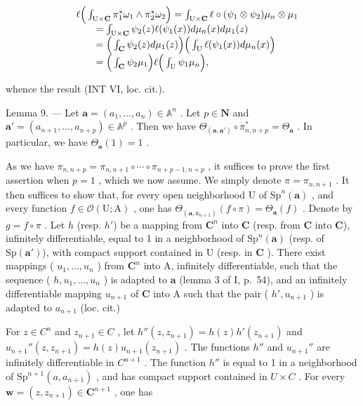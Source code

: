\[
\begin{array}{r l} & {\ell \Big (\int_ {\mathrm{U} \times \mathbf {C}} \pi_ {1} ^ {*} \omega_ {1} \wedge \pi_ {2} ^ {*} \omega_ {2} \Big) = \int_ {\mathrm{U} \times \mathbf {C}} \ell \circ (\psi_ {1} \otimes \psi_ {2}) \mu_ {n} \otimes \mu_ {1}} \\ & {\qquad = \int_ {\mathrm{U} \times \mathbf {C}} \psi_ {2} (z) \ell (\psi_ {1} (x)) d \mu_ {n} (x) d \mu_ {1} (z)} \\ & {\qquad = \Big (\int_ {\mathbf {C}} \psi_ {2} (z) d \mu_ {1} (z) \Big) \Big (\int_ {\mathrm{U}} \ell (\psi_ {1} (x)) d \mu_ {n} (x) \Big)} \\ & {\qquad = \Big (\int_ {\mathbf {C}} \psi_ {2} \mu_ {1} \Big) \ell \Big (\int_ {\mathrm{U}} \psi_ {1} \mu_ {n} \Big),} \end{array}
\]

whence the result (INT VI, loc. cit.).

Lemma 9. --- Let \(\boldsymbol{a} = (a_1, \ldots, a_n) \in \mathbb{A}^n\) . Let \(p \in \mathbf{N}\) and \(\boldsymbol{a}' = (a_{n+1}, \ldots, a_{n+p}) \in \mathbb{A}^p\) . Then we have \(\Theta_{(\boldsymbol{a}, \boldsymbol{a}')} \circ \pi_{n,n+p}^* = \Theta_{\boldsymbol{a}}\) . In particular, we have \(\Theta_{\boldsymbol{a}}(1) = 1\) .

As we have \(\pi_{n,n+p} = \pi_{n,n+1} \circ \cdots \circ \pi_{n+p-1,n+p}\) , it suffices to prove the first assertion when \(p = 1\) , which we now assume. We simply denote \(\pi = \pi_{n,n+1}\) . It then suffices to show that, for every open neighborhood U of \(\mathrm{Sp}^n(\boldsymbol{a})\) , and every function \(f \in \mathcal{O}(\mathrm{U};\mathrm{A})\) , one has \(\Theta_{(\boldsymbol{a},a_{n+1})}(f \circ \pi) = \Theta_{\boldsymbol{a}}(f)\) . Denote by \(g = f \circ \pi\) . Let \(h\) (resp. \(h'\)) be a mapping from \(\mathbf{C}^n\) into \(\mathbf{C}\) (resp. from \(\mathbf{C}\) into \(\mathbf{C}\)), infinitely differentiable, equal to 1 in a neighborhood of \(\mathrm{Sp}^n(\boldsymbol{a})\) (resp. of \(\mathrm{Sp}(\boldsymbol{a}')\)), with compact support contained in U (resp. in \(\mathbf{C}\) ). There exist mappings ( \(u_1, \ldots, u_n\) ) from \(\mathbf{C}^n\) into A, infinitely differentiable, such that the sequence ( \(h, u_1, \ldots, u_n\) ) is adapted to \(\boldsymbol{a}\) (lemma 3 of I, p.~54), and an infinitely differentiable mapping \(u_{n+1}\) of \(\mathbf{C}\) into A such that the pair ( \(h', u_{n+1} \) ) is adapted to \(a_{n+1}\) (loc. cit.)

For \(z \in C^{n}\) and \(z_{n+1} \in C\) , let \(h''(z, z_{n+1}) = h(z)h'(z_{n+1})\) and \(u_{n+1}''(z, z_{n+1}) = h(z)u_{n+1}(z_{n+1})\) . The functions \(h''\) and \(u_{n+1}''\) are infinitely differentiable in \(C^{n+1}\) . The function \(h''\) is equal to 1 in a neighborhood of \(\mathrm{Sp}^{n+1}(a, a_{n+1})\) , and has compact support contained in \(U \times C\) . For every \(\boldsymbol{w} = (z, z_{n+1}) \in \mathbf{C}^{n+1}\) , one has

